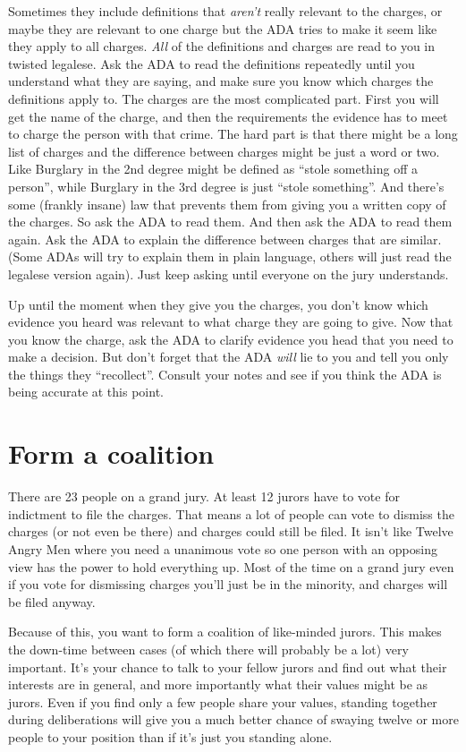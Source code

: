 \documentclass[letterpaper]{article}
\begin{document}
Sometimes they include definitions that \emph{aren't} really relevant to the charges, or maybe they are relevant to one charge but the ADA tries to make it seem like they apply to all charges. 
\emph{All} of the definitions and charges are read to you in twisted legalese.
Ask the ADA to read the definitions repeatedly until you understand what they are saying, and make sure you know which charges the definitions apply to.  
The charges are the most complicated part. 
First you will get the name of the charge, and then the requirements the evidence has to meet to charge the person with that crime. 
The hard part is that there might be a long list of charges and the difference between charges might be just a word or two. 
Like Burglary in the 2nd degree might be defined as ``stole something off a person'', while Burglary in the 3rd degree is just ``stole something''. 
And there's some (frankly insane) law that prevents them from giving you a written copy of the charges. 
So ask the ADA to read them. 
And then ask the ADA to read them again. 
Ask the ADA to explain the difference between charges that are similar. 
(Some ADAs will try to explain them in plain language, others will just read the legalese version again). 
Just keep asking until everyone on the jury understands.

Up until the moment when they give you the charges, you don't know which evidence you heard was relevant to what charge they are going to give. 
Now that you know the charge, ask the ADA to clarify evidence you head that you need to make a decision. 
But don't forget that the ADA \emph{will} lie to you and tell you only the things they ``recollect''.  
Consult your notes and see if you think the ADA is being accurate at this point.

\section*{Form a coalition}
There are 23 people on a grand jury. 
At least 12 jurors have to vote for indictment to file the charges. 
That means a lot of people can vote to dismiss the charges (or not even be there) and charges could still be filed.
It isn't like Twelve Angry Men where you need a unanimous vote so one person with an opposing view has the power to hold everything up.
Most of the time on a grand jury even if you vote for dismissing charges you'll just be in the minority, and charges will be filed anyway.

Because of this, you want to form a coalition of like-minded jurors.
This makes the down-time between cases (of which there will probably be a lot) very important.
It's your chance to talk to your fellow jurors and find out what their interests are in general, and more importantly what their values might be as jurors.
Even if you find only a few people share your values, standing together during deliberations will give you a much better chance of swaying twelve or more people to your position than if it's just you standing alone.
\end{document}
